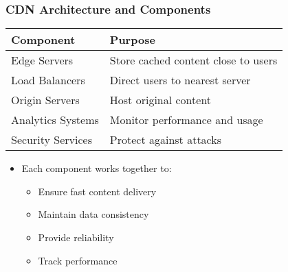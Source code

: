 \documentclass{beamer}
\begin{document}
\begin{frame}
    \frametitle{CDN Architecture and Components}
    
    \begin{tabular}{|p{}|p{}|}
        \hline
        \textbf{Component} & \textbf{Purpose} \\
        \hline
        Edge Servers & Store cached content close to users \\
        \hline
        Load Balancers & Direct users to nearest server \\
        \hline
        Origin Servers & Host original content \\
        \hline
        Analytics Systems & Monitor performance and usage \\
        \hline
        Security Services & Protect against attacks \\
        \hline
    \end{tabular}
    
    \begin{itemize}
        \item Each component works together to:
        \begin{itemize}
            \item Ensure fast content delivery
            \item Maintain data consistency
            \item Provide reliability
            \item Track performance
        \end{itemize}
    \end{itemize}
\end{frame}
\end{document}
